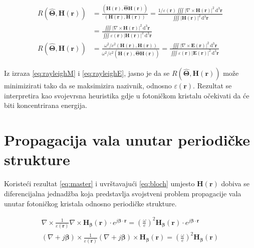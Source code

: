 \documentclass[utf8, seminar]{fer}
\begin{document}
\begin{align} \label{eq:rayleighM}
	R \left( \hat{\mathbf{\Theta}}, \mathbf{H}(\mathbf{r}) \right)
	&= \frac{ \left(
		\mathbf{H}(\mathbf{r}), \hat{\mathbf{\Theta}}\mathbf{H}(\mathbf{r})
		\right)}
	{
		(\mathbf{H}(\mathbf{r}), \mathbf{H}(\mathbf{r}))
	}
	= \frac{ 1/\varepsilon(\mathbf{r})
		\iiint |\nabla \times \mathbf{H}(\mathbf{r})|^2
		\, \mathrm{d}^3\mathbf{r}}
	{\iiint | \mathbf{H}( \mathbf{r} ) |^2
		\, \mathrm{d}^3\mathbf{r}} 								\nonumber \\
	&= \frac{
		\iiint |\nabla \times \mathbf{H}(\mathbf{r})|^2
		\, \mathrm{d}^3\mathbf{r}}
	{\iiint \varepsilon(\mathbf{r}) | \mathbf{H}( \mathbf{r} ) |^2
		\, \mathrm{d}^3\mathbf{r}}										  \\
	R \left( \hat{\mathbf{\Theta}}, \mathbf{H}(\mathbf{r}) \right)
	&= \frac{
		\omega^2/c^2
		\left(
			\mathbf{H}(\mathbf{r}), \mathbf{H}(\mathbf{r})
		\right)
	}
	{
		\omega^2/c^2
		\left(
			\mathbf{H}(\mathbf{r}), \hat{\mathbf{\Theta}}\mathbf{H}(\mathbf{r})
		\right)
	}
	= \frac{
		\iiint |\nabla \times \mathbf{E}(\mathbf{r})|^2
		\, \mathrm{d}^3\mathbf{r}}
	{\iiint \varepsilon(\mathbf{r}) | \mathbf{E}( \mathbf{r} ) |^2
	\, \mathrm{d}^3\mathbf{r}} \label{eq:rayleighE}
\end{align}

Iz izraza \ref{eq:rayleighM} i \ref{eq:rayleighE}, jasno je da se
${R \left( \hat{\mathbf{\Theta}}, \mathbf{H}(\mathbf{r}) \right)}$ može
minimizirati tako da se maksimizira nazivnik, odnosno
${\varepsilon (\mathbf{r})}$. Rezultat se interpretira kao svojevrsna heuristika
gdje u fotoničkom kristalu očekivati da će biti koncentrirana energija.

\section{Propagacija vala unutar periodičke strukture}

Koristeći rezultat \ref{eq:master} i uvrštavajući \ref{eq:bloch} umjesto
$\mathbf{H}(\mathbf{r})$ dobiva se diferencijalna jednadžba koja predstavlja
svojstveni problem propagacije vala unutar fotoničkog kristala odnosno
periodičke strukture.

\begin{align} \label{eq:master_bloch}
	\nabla \times
	\frac{1}{\varepsilon(\mathbf{r})} \nabla \times
	\mathbf{H}_\mathbf{\beta}(\mathbf{r}) \cdot
	e^{j \mathbf{\beta} \cdot \mathbf{r}}
	= \left(
		\frac{\omega}{c}
	\right)^2
	\mathbf{H}_\mathbf{\beta}(\mathbf{r}) \cdot
		e^{j \mathbf{\beta} \cdot \mathbf{r}}	\nonumber \\
	(\nabla + j\mathbf{\beta}) \times
	\frac{1}{\varepsilon(\mathbf{r})}
	(\nabla + j\mathbf{\beta}) \times
	\mathbf{H}_\mathbf{\beta}(\mathbf{r})
	= \left(
		\frac{\omega}{c}
	\right)^2
	\mathbf{H}_\mathbf{\beta}(\mathbf{r})
\end{align}
\end{document}
